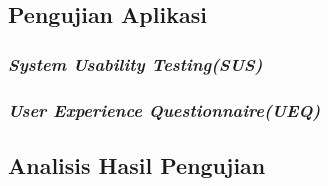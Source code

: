\subsection{Pengujian Aplikasi}
\subsubsection{\textit{System Usability Testing(SUS)}}
\subsubsection{\textit{User Experience Questionnaire(UEQ)}}
\subsection{Analisis Hasil Pengujian}
